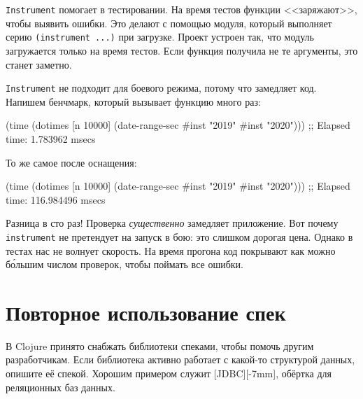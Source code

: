 
\verb|Instrument| помогает в тестировании. На время тестов функции
<<заряжают>>, чтобы выявить ошибки. Это делают с помощью модуля, который
выполняет серию \verb|(instrument ...)| при загрузке. Проект устроен так, что
модуль загружается только на время тестов. Если функция получила не те
аргументы, это станет заметно.


\verb|Instrument| не подходит для боевого режима, потому что замедляет
код. Напишем бенчмарк, который вызывает функцию много раз:


\begin{english}
  \begin{clojure}
(time
 (dotimes [n 10000]
   (date-range-sec #inst "2019" #inst "2020")))
;; Elapsed time: 1.783962 msecs
  \end{clojure}
\end{english}

\noindent
То же самое после оснащения:

\begin{english}
  \begin{clojure}
(time
 (dotimes [n 10000]
   (date-range-sec #inst "2019" #inst "2020")))
;; Elapsed time: 116.984496 msecs
  \end{clojure}
\end{english}


Разница в сто раз! Проверка \emph{существенно} замедляет приложение. Вот почему
\verb|instrument| не претендует на запуск в бою: это слишком дорогая
цена. Однако в тестах нас не волнует скорость. На время прогона код покрывают
как можно б\'{о}льшим числом проверок, чтобы поймать все ошибки.

\section{Повторное использование спек}


В Clojure принято снабжать библиотеки спеками, чтобы помочь другим
разработчикам. Если библиотека активно работает с какой-то структурой данных,
опишите её спекой. Хорошим примером служит
[JDBC][-7mm], обёртка для реляционных
баз данных.

